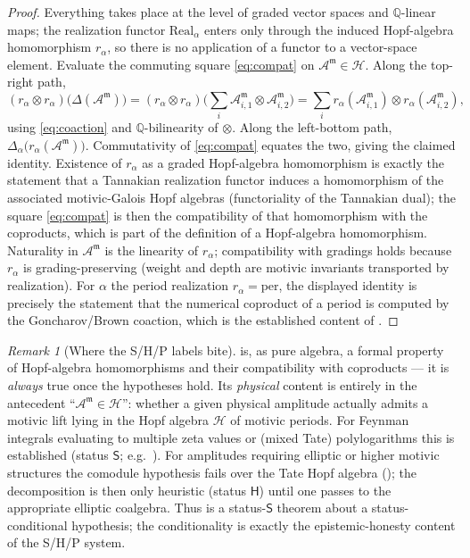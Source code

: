 \documentclass[12pt]{article}
\theoremstyle{definition}
\theoremstyle{remark}
\newtheorem{remark}[theorem]{Remark}
\newcommand{\Real}{\mathrm{Real}}
\newcommand{\per}{\mathrm{per}}
\newcommand{\Amm}{\mathcal{A}^{\mathfrak{m}}}
\newcommand{\coA}{\Delta}
\newcommand{\Zmot}{\mathcal{H}}
\newcommand{\Qbb}{\mathbb{Q}}
\newcommand{\Slab}{\ensuremath{\mathsf{S}}}
\newcommand{\Hlab}{\ensuremath{\mathsf{H}}}
\begin{document}
\begin{proof}
Everything takes place at the level of graded vector spaces and $\Qbb$-linear maps; the
realization functor $\Real_\alpha$ enters only through the induced Hopf-algebra homomorphism
$r_\alpha$, so there is no application of a functor to a vector-space element. Evaluate the
commuting square \eqref{eq:compat} on $\Amm\in\Zmot$. Along the top-right path,
\[
(r_\alpha\otimes r_\alpha)\big(\coA(\Amm)\big)
=(r_\alpha\otimes r_\alpha)\Big(\sum_i\Amm_{i,1}\otimes\Amm_{i,2}\Big)
=\sum_i r_\alpha(\Amm_{i,1})\otimes r_\alpha(\Amm_{i,2}),
\]
using \eqref{eq:coaction} and $\Qbb$-bilinearity of $\otimes$. Along the left-bottom path,
$\coA_\alpha\big(r_\alpha(\Amm)\big)$. Commutativity of \eqref{eq:compat} equates the two,
giving the claimed identity. Existence of $r_\alpha$ as a graded Hopf-algebra homomorphism is
exactly the statement that a Tannakian realization functor induces a homomorphism of the
associated motivic-Galois Hopf algebras (functoriality of the Tannakian dual); the square
\eqref{eq:compat} is then the compatibility of that homomorphism with the coproducts, which
is part of the definition of a Hopf-algebra homomorphism. Naturality in $\Amm$ is the
linearity of $r_\alpha$; compatibility with gradings holds because $r_\alpha$ is
grading-preserving (weight and depth are motivic invariants transported by realization). For
$\alpha$ the period realization $r_\alpha=\per$, the displayed identity is precisely the
statement that the numerical coproduct of a period is computed by the Goncharov/Brown
coaction, which is the established content of \cite{Goncharov2005, BrownFeynman, PanzerSchnetz}.
\end{proof}

\begin{remark}[Where the S/H/P labels bite]
\label{rem:labels-bite}
 is, as pure algebra, a formal property of Hopf-algebra homomorphisms and
their compatibility with coproducts --- it is \emph{always} true once the hypotheses hold.
Its \emph{physical} content is entirely in the antecedent ``$\Amm\in\Zmot$'': whether a given
physical amplitude actually admits a motivic lift lying in the Hopf algebra $\Zmot$ of
motivic periods. For Feynman integrals evaluating to multiple zeta
values or (mixed Tate) polylogarithms this is established (status \Slab; e.g.\
\cite{PanzerSchnetz}). For amplitudes requiring elliptic or higher motivic structures the
comodule hypothesis fails over the Tate Hopf algebra (\Cref{thm:nontate}); the decomposition
is then only heuristic (status \Hlab) until one passes to the appropriate elliptic coalgebra.
Thus \Cref{thm:cad} is a status-\Slab{} theorem about a status-conditional hypothesis; the
conditionality is exactly the epistemic-honesty content of the S/H/P system.
\end{remark}
\end{document}
